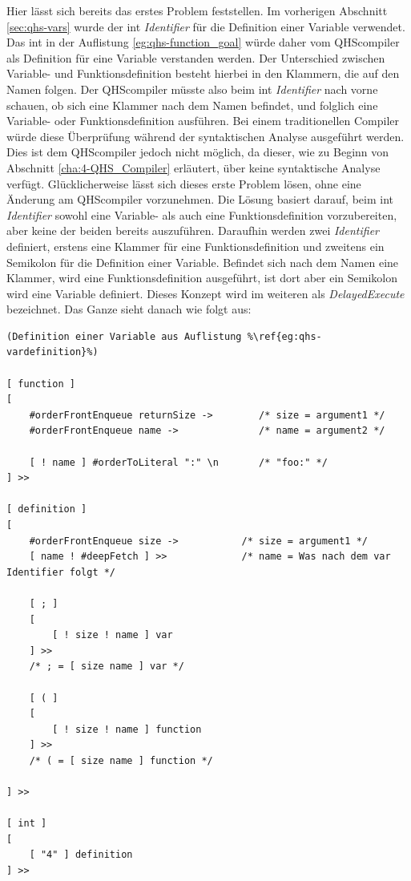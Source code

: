 Hier lässt sich bereits das erstes Problem feststellen. Im vorherigen Abschnitt \ref{sec:qhs-vars} wurde der {\selectListingFont int} \textit{Identifier} für die Definition einer Variable verwendet. 
Das {\selectListingFont int} in der Auflistung \ref{eg:qhs-function_goal} würde daher vom QHScompiler als Definition für eine Variable verstanden werden.
Der Unterschied zwischen Variable- und Funktionsdefinition besteht hierbei in den Klammern, die auf den Namen folgen.
Der QHScompiler müsste also beim {\selectListingFont int} \textit{Identifier} nach vorne schauen, ob sich eine Klammer nach dem Namen befindet, und folglich eine Variable- oder Funktionsdefinition ausführen.
Bei einem traditionellen Compiler würde diese Überprüfung während der syntaktischen Analyse ausgeführt werden.
Dies ist dem QHScompiler jedoch nicht möglich, da dieser, wie zu Beginn von Abschnitt \ref{cha:4-QHS_Compiler} erläutert, über keine syntaktische Analyse verfügt.
Glücklicherweise lässt sich dieses erste Problem lösen, ohne eine Änderung am QHScompiler vorzunehmen.
Die Lösung basiert darauf, beim {\selectListingFont int} \textit{Identifier} sowohl eine Variable- als auch eine Funktionsdefinition vorzubereiten, aber keine der beiden bereits auszuführen.
Daraufhin werden zwei \textit{Identifier} definiert, erstens eine Klammer für eine Funktionsdefinition und zweitens ein Semikolon für die Definition einer Variable.
Befindet sich nach dem Namen eine Klammer, wird eine Funktionsdefinition ausgeführt, ist dort aber ein Semikolon wird eine Variable definiert.
Dieses Konzept wird im weiteren als \textit{DelayedExecute} bezeichnet. Das Ganze sieht danach wie folgt aus:

\begin{minipage}{\linewidth}
\begin{lstlisting}[language=QHS, caption=Implementation eines \textit{DelayedExecute} für Definitionen]
(Definition einer Variable aus Auflistung %\ref{eg:qhs-vardefinition}%)

[ function ]
[
    #orderFrontEnqueue returnSize ->        /* size = argument1 */
    #orderFrontEnqueue name ->              /* name = argument2 */

    [ ! name ] #orderToLiteral ":" \n       /* "foo:" */
] >>

[ definition ]
[
    #orderFrontEnqueue size ->           /* size = argument1 */
    [ name ! #deepFetch ] >>             /* name = Was nach dem var Identifier folgt */

    [ ; ]
    [
        [ ! size ! name ] var 
    ] >>
    /* ; = [ size name ] var */

    [ ( ]
    [
        [ ! size ! name ] function 
    ] >>
    /* ( = [ size name ] function */

] >>

[ int ]
[
    [ "4" ] definition
] >>
\end{lstlisting}
\end{minipage}


